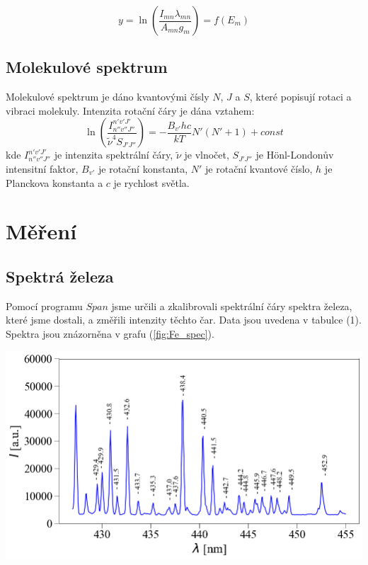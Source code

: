 \documentclass[a4paper,11pt]{article}
\begin{document}
    \hspace{10pt}
    \begin{minipage}[t]{0.5\textwidth} 
                \begin{equation}
                    y = \ln\left(\frac{I_{mn}\lambda_{mn}}{A_{mn}g_m}\right) = f(E_m)
                \end{equation}

            \subsection{Molekulové spektrum}
                \par Molekulové spektrum je dáno kvantovými čísly $N$, $J$ a $S$, které popisují rotaci a vibraci molekuly. Intenzita rotační čáry je dána vztahem:
                \begin{equation}
                    \ln \left(\frac{I_{n''v''J''}^{n'v'J'}}{\tilde{\nu}^4 S_{J'J''}}\right) = -\frac{B_{v'}hc}{kT}N'(N'+1) + const
                \end{equation}
                kde $I_{n''v''J''}^{n'v'J'}$ je intenzita spektrální čáry, $\tilde{\nu}$ je vlnočet, $S_{J'J''}$ je Hönl-Londonův intensitní faktor, $B_{v'}$ je rotační konstanta, $N'$ je rotační kvantové číslo, $h$ je Planckova konstanta a $c$ je rychlost světla.

        \section{Měření}   
            \subsection{Spektrá železa}
                Pomocí programu $Span$ \cite{span} jsme určili a zkalibrovali spektrální čáry spektra železa, které jsme dostali, a změřili intenzity těchto čar. Data jsou uvedena v tabulce (1). Spektra jsou znázorněna v grafu (\ref{fig:Fe_spec}).

                \vspace{15pt}   
                \par \centering
                \includegraphics[scale=0.33]{Fe_spec}
                \captionsetup{justification=centering, font=footnotesize}
                \label{fig:Fe_spec}
                \vspace{10pt}
                \raggedright   
                
    \end{minipage}
\end{document}
